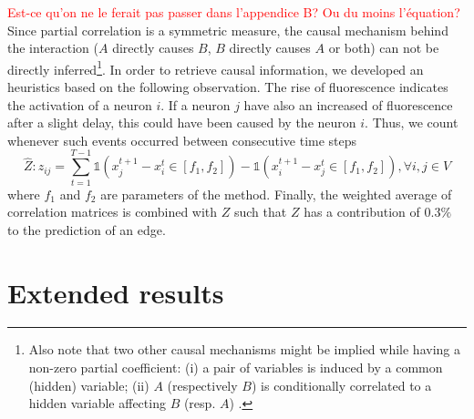 \documentclass[wcp]{jmlr}
\begin{document}
\textcolor{red}{Est-ce qu'on ne le ferait pas passer dans l'appendice B? Ou du moins l'équation?}
Since partial correlation is a symmetric measure, the causal mechanism behind the
interaction ($A$ directly causes $B$, $B$ directly causes $A$ or both) can not
be directly inferred\footnote{Also note that two other causal mechanisms might be
implied while having a non-zero partial coefficient: (i) a pair of variables
is induced by a common (hidden) variable; (ii) $A$ (respectively $B$) is
conditionally correlated to a hidden variable affecting $B$ (resp. $A$)
\citep{de2004discovery}.}.
In order to retrieve causal information, we developed an
heuristics based on the following observation. The rise of fluorescence
indicates the activation of a neuron $i$. If a neuron $j$ have also
an increased of fluorescence after a slight delay, this could have been
caused by the neuron $i$. Thus, we count whenever
such events occurred between consecutive time steps
\[
\hat{Z}: z_{ij} = \sum_{t=1}^{T - 1}
    \mathbb{1}(x_j^{t+1} - x_i^t \in \left[f_1, f_2 \right]) -
    \mathbb{1}(x_i^{t+1} - x_j^t \in \left[f_1, f_2 \right]), \forall i, j \in V
\]
where $f_1$ and $f_2$ are parameters of the method.
Finally, the weighted average of correlation matrices is combined with $Z$ such
that $Z$ has a contribution of $0.3\%$ to the prediction of an edge.



\section{Extended results}
\end{document}
